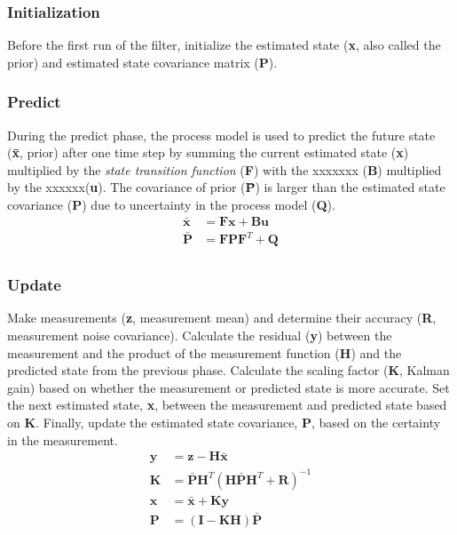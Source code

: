 \documentclass[12pt,letterpaper,titlepage]{report}
\begin{document}
\subsubsection*{Initialization}
Before the first run of the filter, initialize the estimated state (\textbf{x}, also called the prior) and estimated state covariance matrix (\textbf{P}).
\subsubsection*{Predict}
During the predict phase, the process model is used to predict the future state (\textbf{\=x}, prior) after one time step by summing the current estimated state (\textbf{x}) multiplied by the \textit{state transition function} (\textbf{F}) with the xxxxxxx (\textbf{B}) multiplied by the xxxxxx(\textbf{u}). The covariance of prior (\textbf{\=P}) is larger than the estimated state covariance (\textbf{P}) due to uncertainty in the process model (\textbf{Q}).
\begin{align*}
\bar{\textbf{x}} &= \textbf{Fx} + \textbf{Bu}\\
\bar{\textbf{P}} &= \textbf{FPF}^T + \textbf{Q}\\
\end{align*}

\subsubsection*{Update}
Make measurements (\textbf{z}, measurement mean) and determine their accuracy (\textbf{R}, measurement noise covariance). Calculate the residual (\textbf{y}) between the measurement and the product of the measurement function (\textbf{H}) and the predicted state from the previous phase. Calculate the scaling factor (\textbf{K}, Kalman gain) based on whether the measurement or predicted state is more accurate. Set the next estimated state, \textbf{x}, between the measurement and predicted state based on \textbf{K}. Finally, update the estimated state covariance, \textbf{P}, based on the certainty in the measurement.
\begin{align*}
\textbf{y} &= \textbf{z} - \textbf{H}\bar{\textbf{x}}\\
\textbf{K} &= \bar{\textbf{P}}\textbf{H}^T(\textbf{H}\bar{\textbf{P}}\textbf{H}^T+\textbf{R})^{-1}\\
\textbf{x} &= \bar{\textbf{x}} + \textbf{Ky}\\
\textbf{P} &= (\textbf{I}-\textbf{KH})\bar{\textbf{P}}\\
\end{align*}
\end{document}
